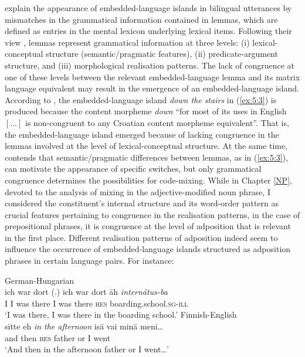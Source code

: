 \noindent \citet{myers-scotton-matching-1995} explain the appearance of embedded-language islands in bilingual utterances by mismatches in the grammatical information contained in lemmas, which are defined as entries in the mental lexicon underlying lexical items. Following their view \citep[][1008--1014]{myers-scotton-matching-1995}, lemmas represent grammatical information at three levels: (i) lexical-conceptual structure (semantic/pragmatic features), (ii) predicate-argument structure, and (iii) morphological realisation patterns. The lack of congruence at one of these levels between the relevant embedded-language lemma and its matrix language equivalent may result in the emergence of an embedded-language island. According to \citet[][227]{hlavac-second-generation-2003}, the embedded-language island \textit{down the stairs} in (\ref{ex:5:3}) is produced because the content morpheme \textit{down} ``for most of its uses in English $[\dots{}]$ is non-congruent to any Croatian content morpheme equivalent''. That is, the embedded-language island emerged because of lacking congruence in the lemmas involved at the level of lexical-conceptual structure. At the same time, \citet[258]{deuchar-congruence-2005} contends that semantic/pragmatic differences between lemmas, as in (\ref{ex:5:3}), can motivate the appearance of specific switches, but only grammatical congruence determines the possibilities for code-mixing. While in Chapter \ref{NP}, devoted to the analysis of mixing in the adjective-modified noun phrase, I considered the constituent's internal structure and its word-order pattern as crucial features pertaining to congruence in the realisation patterns, in the case of prepositional phrases, it is congruence at the level of adposition that is relevant in the first place. Different realisation patterns of adposition indeed seem to influence the occurrence of embedded-language islands structured as adposition phrases in certain language pairs. For instance:

\ea
\label{ex:5:4}
German-Hungarian \citep[435]{szabo-language-2010}\\
 {ich} {war} {dort (.)} {ich} {war} {dort} {äh} \textit{internátus-ba}\\
	{I} I was there I was there \textsc{hes} boarding.school.\textsc{sg-ill}\\
\glt `I was there, I was there in the boarding school.'
\ex
\label{ex:5:5}
Finnish-English \citep[226]{lehtinen-analysis-1966}\\
 {sitte} {eh} \textit{in the afternoon} {isä} {vai} {minä} {meni\dots{}}\\
	{and} then \textsc{hes} {} father or I went\\
\glt `And then in the afternoon father or I went\dots{}'
\z

